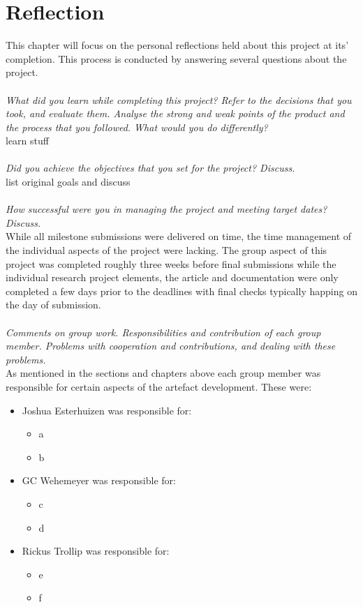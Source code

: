 
\chapter{Reflection} %

\label{Chapter5} %
This chapter will focus on the personal reflections held about this project at its' completion. This process is conducted by answering several questions about the project.
\\\\
\indent \textit{What did you learn while completing this project? Refer to the decisions that you took, and evaluate them. Analyse the strong and weak points of the product and the process that you followed. What would you do differently?}
\\
learn stuff
\\\\
\indent \textit{Did you achieve the objectives that you set for the project? Discuss.}
\\
list original goals and discuss
\\\\
\indent \textit{How successful were you in managing the project and meeting target dates? Discuss.}
\\
While all milestone submissions were delivered on time, the time management of the individual aspects of the project were lacking. The group aspect of this project was completed roughly three weeks before final submissions while the individual research project elements, the article and documentation were only completed a few days prior to the deadlines with final checks typically happing on the day of submission. 
\\\\
\indent \textit{Comments on group work. Responsibilities and contribution of each group member. Problems with cooperation and contributions, and dealing with these problems.}
\\
As mentioned in the sections and chapters above each group member was responsible for certain aspects of the artefact development. These were: %
\begin{itemize}
\item Joshua Esterhuizen was responsible for:
\begin{itemize}
\item a
\item b
\end{itemize}

\item GC Wehemeyer was responsible for:
\begin{itemize}
\item c
\item d
\end{itemize}

\item Rickus Trollip was responsible for:
\begin{itemize}
\item e
\item f
\end{itemize}
\end{itemize}

